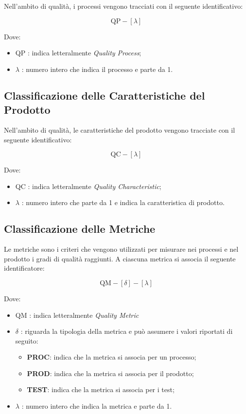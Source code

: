 	Nell'ambito di qualità, i processi vengono tracciati con il seguente identificativo:

	\[
			\text{QP}-[\lambda]
	\]

	Dove: 

	\begin{itemize}
		\item QP : indica letteralmente \textit{Quality Process};
		\item \(\lambda\) : numero intero che indica il processo e parte da 1.
	\end{itemize}


	\subsection{Classificazione delle Caratteristiche del Prodotto}

	Nell'ambito di qualità, le caratteristiche del prodotto vengono tracciate con il seguente identificativo:

	\[
			\text{QC}-[\lambda]
	\]

	Dove: 

	\begin{itemize}
		\item QC : indica letteralmente \textit{Quality Characteristic};
		\item \(\lambda\) : numero intero che parte da 1 e indica la caratteristica di prodotto.
	\end{itemize}

	\subsection{Classificazione delle Metriche}

	Le metriche sono i criteri che vengono utilizzati per misurare nei processi e nel prodotto i gradi di qualità raggiunti. A ciascuna metrica si associa il seguente identificatore:

	\[
			\text{QM}-[\delta]-[\lambda]
	\]

	Dove: 

	\begin{itemize}
		\item QM : indica letteralmente \textit{Quality Metric}
		\item \(\delta\) : riguarda la tipologia della metrica e può assumere i valori riportati di seguito:
			\begin{itemize}
				\item \textbf{PROC}: indica che la metrica si associa per un processo;
				\item \textbf{PROD}: indica che la metrica si associa per il prodotto;
				\item \textbf{TEST}: indica che la metrica si associa per i test;
			\end{itemize}
		\item \(\lambda\) : numero intero che indica la metrica e parte da 1.
	\end{itemize}



